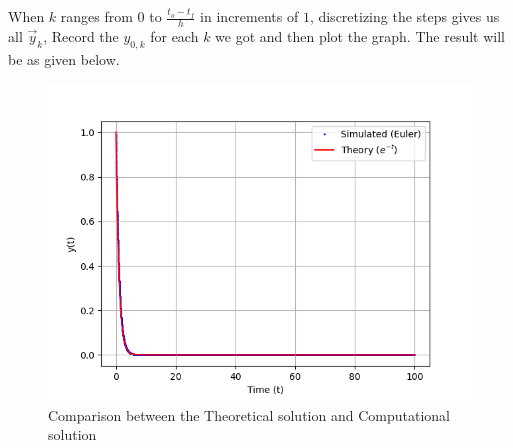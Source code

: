 \documentclass[journal]{IEEEtran}
\begin{document}
When $k$ ranges from $0$ to $\frac{t_o-t_f}{h}$ in increments of $1$, discretizing the steps gives us all $\vec{y}_k$, Record the $y_{0,k}$ for each $k$ we got and then plot the graph. The result will be as given below.
\begin{figure}[h!]
   \centering
   \includegraphics[width=1\linewidth]{figs/fig.png}
   \caption{Comparison between the Theoretical solution and Computational solution}
   \label{stemplot}
\end{figure}
\end{document}
